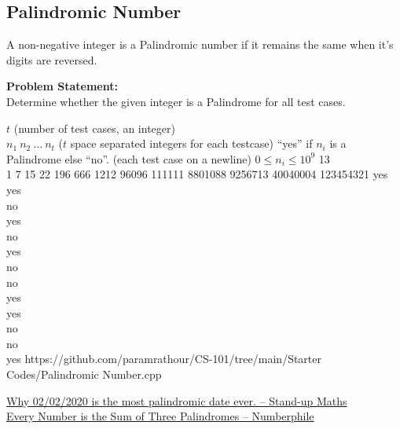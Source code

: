 \documentclass[../../Problems]{subfiles}
\begin{document}
\subsection{Palindromic Number}
A non-negative integer is a Palindromic number if it remains the same when it's digits are reversed.

\textbf{Problem Statement:}\\
Determine whether the given integer is a Palindrome for all test cases.
\begin{testcases}
	{$t$ \hfill(number of test cases, an integer)\\
	$n_1\ n_2\ \ldots\ n_t$ \hfill($t$ space separated integers for each testcase)}
	{``yes'' if $n_i$ is a Palindrome else ``no''. \hfill(each test case on a newline)}
	{$0 \leq n_i \leq 10^{9}$}
	{13\\1 7 15 22 196 666 1212 96096 111111 8801088 9256713 40040004 123454321}
	{yes\\yes\\no\\yes\\no\\yes\\no\\no\\yes\\yes\\no\\no\\yes}
	{https://github.com/paramrathour/CS-101/tree/main/Starter Codes/Palindromic Number.cpp}
\end{testcases}
\begin{funvideo}
\href{https://youtu.be/4fE_sXZjxng}{Why 02/02/2020 is the most palindromic date ever. -- Stand-up Maths}\\
\href{https://youtu.be/OKhacWQ2fCs}{Every Number is the Sum of Three Palindromes -- Numberphile}
\end{funvideo}
\end{document}
